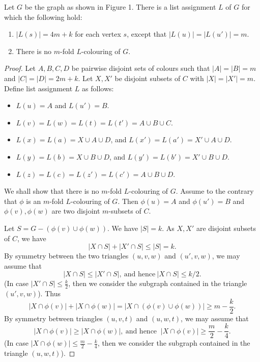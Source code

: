\documentclass[12pt]{article}
\begin{document}
\begin{lemma}
	\label{lem1}
	Let $G$ be the graph as shown in Figure 1. There is a list assignment $L$
	of $G$ for which the following hold:
	\begin{enumerate}
		\item $|L(s)|=4m+k$ for each vertex $s$, except that  $|L(u)|=|L(u')|=m$.
		\item There is no $m$-fold $L$-colouring of $G$.
	\end{enumerate} 
\end{lemma}
\begin{proof}
	Let $A, B, C,D$ be pairwise disjoint sets of colours such that $|A|=|B|=m$ and $|C|=|D|=2m+k$. Let $X, X'$ be disjoint subsets of $C$ with $|X|=|X'|=m$. Define list assignment $L$ as follows:
	\begin{itemize}
		\item $L(u)=A$ and $L(u')=B$.
		\item $L(v)=L(w)=L(t)=L(t')=A \cup B \cup C$.
		\item $L(x)=L(a)=X \cup A \cup D$, and $L(x')=L(a')=X' \cup A \cup D$.
		\item $L(y)=L(b)=X \cup B \cup D$, and $L(y')=L(b')=X' \cup B \cup D$.
		\item $L(z)=L(c)= L(z')=L(c')=A \cup B \cup D$.
	\end{itemize}
	We shall show that there is no $m$-fold $L$-colouring of $G$.
	Assume to the contrary that $\phi$ is an $m$-fold $L$-colouring of $G$.
	Then $\phi(u)=A$ and $\phi(u')=B$ and $\phi(v), \phi(w)$ are two disjoint $m$-subsets of $C$.
	
	Let $S=G-(\phi(v) \cup \phi(w))$. We have $|S|=k$.
	As $X, X'$ are  disjoint subsets of $C$, we have
	$$|X \cap S|+|X' \cap S| \le |S|=k.$$
	By symmetry between the two triangles $(u,v,w)$ and $(u',v,w)$, we may assume that 
	$$|X \cap S| \le |X' \cap S|, \ \text{and hence} \ |X \cap S| \le k/2.$$
	(In case $|X' \cap S| \le \frac k2$, then we consider the subgraph contained in the triangle $(u',v,w)$).
	Thus
	$$|X \cap \phi(v)| +|X \cap \phi(w)|=|X \cap (\phi(v) \cup \phi(w))| \ge m- \frac k2.$$
	By symmetry between triangles $(u,v,t)$ and $(u,w,t)$, we may assume that 
	$$|X \cap \phi(v)| \ge |X \cap \phi(w)|, \ \text{and hence } \ |X \cap \phi(v)| \ge \frac m2 - \frac k4.$$
		(In case $|X \cap \phi(w)| \le \frac m2 - \frac k4$, then we consider the subgraph contained in the triangle $(u,w,t)$).
		

\end{proof}
\end{document}
